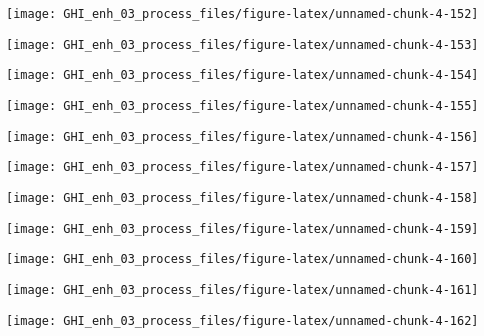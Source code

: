 \documentclass[
  10pt,
  a4paper,oneside]{article}
\begin{document}
\begin{center}\texttt{[image: GHI\_enh\_03\_process\_files/figure-latex/unnamed-chunk-4-152]} \end{center}

\begin{center}\texttt{[image: GHI\_enh\_03\_process\_files/figure-latex/unnamed-chunk-4-153]} \end{center}

\begin{center}\texttt{[image: GHI\_enh\_03\_process\_files/figure-latex/unnamed-chunk-4-154]} \end{center}

\begin{center}\texttt{[image: GHI\_enh\_03\_process\_files/figure-latex/unnamed-chunk-4-155]} \end{center}

\begin{center}\texttt{[image: GHI\_enh\_03\_process\_files/figure-latex/unnamed-chunk-4-156]} \end{center}

\begin{center}\texttt{[image: GHI\_enh\_03\_process\_files/figure-latex/unnamed-chunk-4-157]} \end{center}

\begin{center}\texttt{[image: GHI\_enh\_03\_process\_files/figure-latex/unnamed-chunk-4-158]} \end{center}

\begin{center}\texttt{[image: GHI\_enh\_03\_process\_files/figure-latex/unnamed-chunk-4-159]} \end{center}

\begin{center}\texttt{[image: GHI\_enh\_03\_process\_files/figure-latex/unnamed-chunk-4-160]} \end{center}

\begin{center}\texttt{[image: GHI\_enh\_03\_process\_files/figure-latex/unnamed-chunk-4-161]} \end{center}

\begin{center}\texttt{[image: GHI\_enh\_03\_process\_files/figure-latex/unnamed-chunk-4-162]} \end{center}
\end{document}
